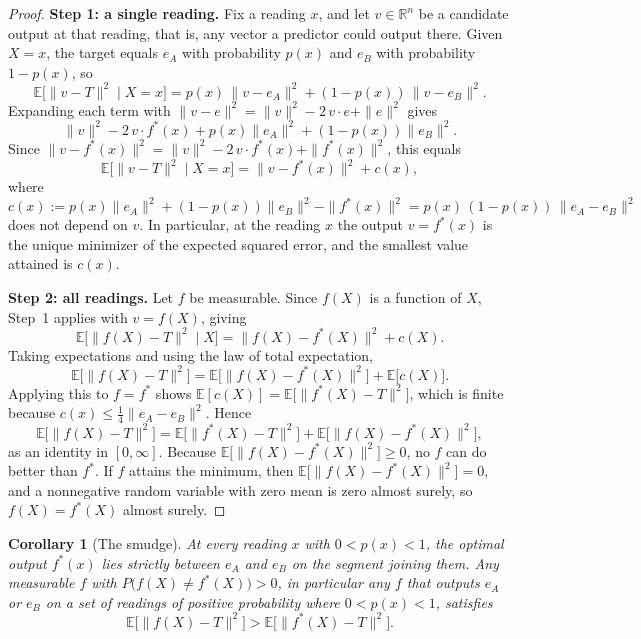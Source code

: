 \documentclass[11pt]{article}
\newtheorem{corollary}{Corollary}
\begin{document}
\begin{proof}
\textbf{Step 1: a single reading.} Fix a reading $x$, and let
$v \in \mathbb{R}^n$ be a candidate output at that reading, that is, any
vector a predictor could output there. Given $X=x$, the target equals $e_A$ with probability $p(x)$ and $e_B$ with
probability $1-p(x)$, so
\[
  \mathbb{E}\big[\|v-T\|^2 \mid X=x\big]
  = p(x)\,\|v-e_A\|^2 + (1-p(x))\,\|v-e_B\|^2 .
\]
Expanding each term with $\|v-e\|^2 = \|v\|^2 - 2\,v\cdot e + \|e\|^2$ gives
\[
  \|v\|^2 - 2\,v\cdot f^*(x) + p(x)\|e_A\|^2 + (1-p(x))\|e_B\|^2 .
\]
Since $\|v-f^*(x)\|^2 = \|v\|^2 - 2\,v\cdot f^*(x) + \|f^*(x)\|^2$, this equals
\[
  \mathbb{E}\big[\|v-T\|^2 \mid X=x\big] = \|v-f^*(x)\|^2 + c(x),
\]
where
\[
  c(x) := p(x)\|e_A\|^2 + (1-p(x))\|e_B\|^2 - \|f^*(x)\|^2
        = p(x)\,(1-p(x))\,\|e_A-e_B\|^2
\]
does not depend on $v$. In particular, at the reading $x$ the output
$v=f^*(x)$ is the unique minimizer of the expected squared error, and the
smallest value attained is $c(x)$.

\textbf{Step 2: all readings.} Let $f$ be measurable. Since $f(X)$ is a
function of $X$, Step~1 applies with $v = f(X)$, giving
\[
  \mathbb{E}\big[\|f(X)-T\|^2 \mid X\big] = \|f(X)-f^*(X)\|^2 + c(X).
\]
Taking expectations and using the law of total expectation,
\[
  \mathbb{E}\big[\|f(X)-T\|^2\big]
  = \mathbb{E}\big[\|f(X)-f^*(X)\|^2\big] + \mathbb{E}\big[c(X)\big].
\]
Applying this to $f=f^*$ shows $\mathbb{E}[c(X)] = \mathbb{E}\big[\|f^*(X)-T\|^2\big]$,
which is finite because $c(x) \le \tfrac14\|e_A-e_B\|^2$. Hence
\begin{equation}
  \mathbb{E}\big[\|f(X)-T\|^2\big]
  = \mathbb{E}\big[\|f^*(X)-T\|^2\big] + \mathbb{E}\big[\|f(X)-f^*(X)\|^2\big],
  \label{eq:decomp}
\end{equation}
as an identity in $[0,\infty]$. Because
$\mathbb{E}\big[\|f(X)-f^*(X)\|^2\big] \ge 0$, no $f$ can do better than
$f^*$. If $f$ attains the minimum, then
$\mathbb{E}\big[\|f(X)-f^*(X)\|^2\big] = 0$, and a nonnegative random variable
with zero mean is zero almost surely, so $f(X)=f^*(X)$ almost surely.
\end{proof}

\begin{corollary}[The smudge]
\label{cor:smudge}
At every reading $x$ with $0<p(x)<1$, the optimal output $f^*(x)$ lies
strictly between $e_A$ and $e_B$ on the segment joining them. Any measurable
$f$ with $P\big(f(X)\neq f^*(X)\big) > 0$, in particular any $f$ that outputs
$e_A$ or $e_B$ on a set of readings of positive probability where
$0<p(x)<1$, satisfies
\[
  \mathbb{E}\big[\|f(X)-T\|^2\big] > \mathbb{E}\big[\|f^*(X)-T\|^2\big].
\]
\end{corollary}
\end{document}
